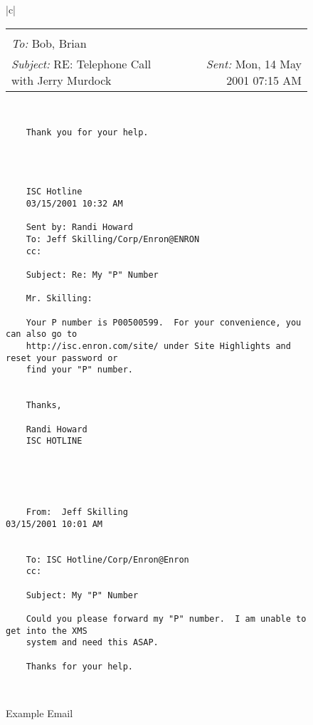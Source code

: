 \documentclass{llncs}
\begin{document}


\begin{figure}
\caption{Example Email}
\label{fig:examplemail}
\centering
\begin{tabular}{|c|}
	\hline 
	\begin{tabular}{lr}
		\makecell{
			\textit{From:} Alice\\ 
			\textit{To:} Bob, Brian\\
			\textit{Subject:} RE: Telephone Call with Jerry Murdock} &
		\textit{Sent:} Mon, 14 May 2001 07:15 AM
	\end{tabular}
	\\ 
	\hline 
	\begin{lstlisting}
	Thank you for your help.
	
	
	
	
	ISC Hotline
	03/15/2001 10:32 AM
	
	Sent by: Randi Howard
	To: Jeff Skilling/Corp/Enron@ENRON
	cc:  
	
	Subject: Re: My "P" Number  
	
	Mr. Skilling:
	
	Your P number is P00500599.  For your convenience, you can also go to 
	http://isc.enron.com/site/ under Site Highlights and reset your password or 
	find your "P" number.
	
	
	Thanks,
	
	Randi Howard
	ISC HOTLINE
	
	
	
	
	
	From:  Jeff Skilling                           03/15/2001 10:01 AM
	
	
	To: ISC Hotline/Corp/Enron@Enron
	cc:  
	
	Subject: My "P" Number
	
	Could you please forward my "P" number.  I am unable to get into the XMS 
	system and need this ASAP.
	
	Thanks for your help.
	\end{lstlisting}
	\\ 
	\hline 
\end{tabular} 
\end{figure}
\end{document}
